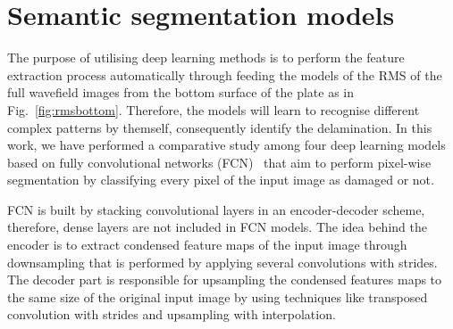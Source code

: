 \section{Semantic segmentation models}
\label{section:semantic_segmentation}
The purpose of utilising deep learning methods is to perform the feature extraction process automatically through feeding the models  of the RMS of the full wavefield images from the bottom surface of the plate as in Fig.~\ref{fig:rmsbottom}.
Therefore, the models will learn to recognise different complex patterns by themself, consequently identify the delamination. 
In this work, we have performed a comparative study among four deep learning models based on fully convolutional networks (FCN)~\cite{shelhamer2017fully} that aim to perform pixel-wise segmentation by classifying every pixel of the input image as damaged or not. 

FCN is built by stacking convolutional layers in an encoder-decoder scheme, therefore, dense layers are not included in FCN models. 
The idea behind the encoder is to extract condensed feature maps of the input image through downsampling that is performed by applying several convolutions with strides.
The decoder part is responsible for upsampling the condensed features maps to the same size of the original input image by using techniques like transposed convolution with strides and upsampling with interpolation.


